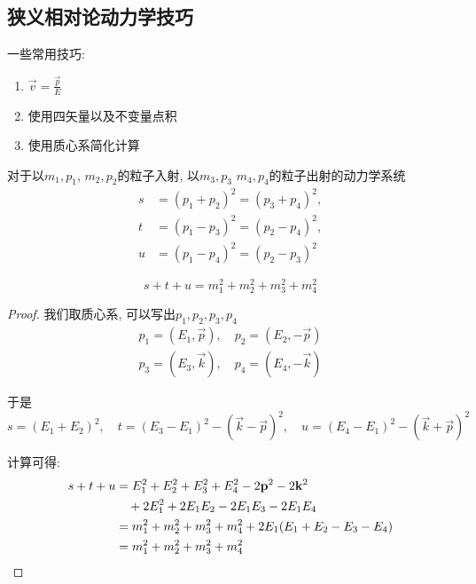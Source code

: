 \subsection{狭义相对论动力学技巧}
一些常用技巧\cite{griffthsPPSRTrick}:
\begin{enumerate}
    \item $\vec v=\frac{\vec p}{E}$
    \item 使用四矢量以及不变量点积
    \item 使用质心系简化计算
\end{enumerate}
\begin{definition}[Mandelstam变量]
    对于以$m_1, p_1$, $m_2, p_2$的粒子入射, 以$m_3, p_3$ $m_4, p_4$的粒子出射的动力学系统
    \begin{equation}
        \begin{aligned}
            s&=(p_1+p_2)^2=(p_3+p_4)^2, \\
            t&=(p_1-p_3)^2=(p_2-p_4)^2, \\
            u&=(p_1-p_4)^2=(p_2-p_3)^2
        \end{aligned}
    \end{equation}
\end{definition}
\begin{theorem}[s+t+u守恒]
    \begin{equation}
        s+t+u=m_1^2+m_2^2+m_3^2+m_4^2
    \end{equation}
\end{theorem}
\begin{proof}
    我们取质心系, 可以写出$p_1, p_2, p_3, p_4$
    \begin{align}
        p_1=(E_1, \vec p), \quad p_2=(E_2, -\vec p)\\
        p_3=(E_3, \vec k), \quad p_4=(E_4, -\vec k)
    \end{align}

    于是
    \begin{equation}
        s=(E_1+E_2)^2, \quad t=(E_3-E_1)^2-(\vec k-\vec p)^2, \quad u=(E_4-E_1)^2-(\vec k+\vec p)^2
    \end{equation}

    计算可得:
    \begin{align}
        s+t+u&=E_1^2+E_2^2+E_3^2+E_4^2-2\vec p^2-2\vec k^2\notag\\
        &\quad+2E_1^2+2E_1E_2-2E_1E_3-2E_1E_4\\
        &=m_1^2+m_2^2+m_3^2+m_4^2+2E_1(E_1+E_2-E_3-E_4)\\
        &=m_1^2+m_2^2+m_3^2+m_4^2
    \end{align}
\end{proof}

